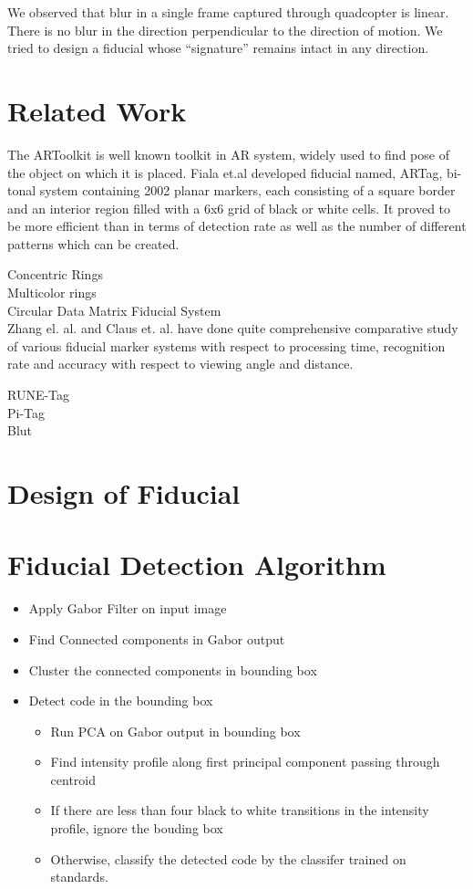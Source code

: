 \documentclass[runningheads]{llncs}
\begin{document}
We observed that blur in a single frame captured through quadcopter is linear.
There is no blur in the direction perpendicular to the direction of motion. We
tried to design a fiducial whose ``signature'' remains intact in any direction.

 
\section{Related Work}
The ARToolkit \cite{ARToolkit02} \cite{kato-artoolkit} is well known toolkit in
AR system, widely used to find pose of the object on which it is placed.
Fiala et.al \cite{Fiala05} developed fiducial named, ARTag, bi-tonal system
containing 2002 planar markers, each consisting of a square border and an
interior region filled with a 6x6 grid of black or white cells. It proved to be
more efficient than \cite{ARToolkit02} in terms of detection rate as well as the
number of different patterns which can be created.  

Concentric Rings\cite{concentric} \\
Multicolor rings \cite{Cho:2001} \cite{Cho97fastcolor} \\
Circular Data Matrix Fiducial System \cite{NaimarkF02} \\

Zhang el. al.\cite{Zhang:2002} and Claus et. al. \cite{ClausF04} have done
quite comprehensive comparative study of various fiducial marker systems with
respect to processing time, recognition rate and accuracy with
respect to viewing angle and distance.

RUNE-Tag \cite{runetag11} \\
Pi-Tag \cite{Pitag13} \\
Blut \cite{Wu:2011}


\section{Design of Fiducial}

\section{Fiducial Detection Algorithm}
\begin{itemize}
  \item Apply Gabor Filter on input image
  \item Find Connected components in Gabor output
  \item Cluster the connected components in bounding box
  \item Detect code in the bounding box
  \begin{itemize}
    \item Run PCA on Gabor output in bounding box
    \item Find intensity profile along first principal component passing through
    centroid
    \item If there are less than four black to white transitions in the
    intensity profile, ignore the bouding box
    \item Otherwise, classify the detected code by the classifer trained on
    standards.
  \end{itemize}
\end{itemize}
\end{document}
